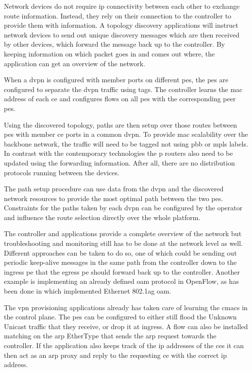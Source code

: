\begin{description}[leftmargin=!,labelwidth=\widthof{\bfseries Topology Discovery}]
	\item[Topology Discovery] Network devices do not require \ac{ip} connectivity between each other to exchange route information. Instead, they rely on their connection to the controller to provide them with information. A topology discovery applications will instruct network devices to send out unique discovery messages which are then received by other devices, which forward the message back up to the controller. By keeping information on which packet goes in and comes out where, the application can get an overview of the network.
	\item[\ac{dvpn} Provisioning] When a \ac{dvpn} is configured with member ports on different \acp{pe}, the \acp{pe} are configured to separate the \ac{dvpn} traffic using tags. The controller learns the \ac{mac} address of each \ac{ce} and configures flows on all \acp{pe} with the corresponding peer \acp{pe}.
	\item[Path Provisioning] Using the discovered topology, paths are then setup over those routes between \acp{pe} with member \ac{ce} ports in a common \ac{dvpn}. To provide \ac{mac} scalability over the backbone network, the traffic will need to be tagged not using \ac{pbb} or \ac{mpls} labels. In contrast with the contemporary technologies the \ac{p} routers also need to be updated using the forwarding information. After all, there are no distribution protocols running between the devices.
	\item[Traffic Engineering] The path setup procedure can use data from the \ac{dvpn} and the discovered network resources to provide the most optimal path between the two \acp{pe}. Constraints for the paths taken by each \ac{dvpn} can be configured by the operator and influence the route selection directly over the whole platform.
	\item[\acs{oam}] The controller and applications provide a complete overview of the network but troubleshooting and monitoring still has to be done at the network level as well. Different approaches can be taken to do so, one of which could be sending out periodic keep-alive messages in the same path from the controller down to the ingress \ac{pe} that the egress \ac{pe} should forward back up to the controller. Another example is implementing an already defined \ac{oam} protocol in OpenFlow, as has been done in \cite{of-oam} which implemented Ethernet 802.1ag \ac{oam}.
	\item[\acs{cmac} Exchange] The \ac{vpn} provisioning applications already has taken care of learning the \acp{cmac} in the control plane. The \acp{pe} can be configured to either still flood the Unknown Unicast traffic that they receive, or drop it at ingress. A flow can also be installed matching on the \ac{arp} EtherType that sends the \ac{arp} request towards the controller. If the application also keeps track of the \ac{ip} addresses of the \acp{ce} it can then act as an \ac{arp} proxy and reply to the requesting \ac{ce} with the correct \ac{ip} address.
\end{description}

